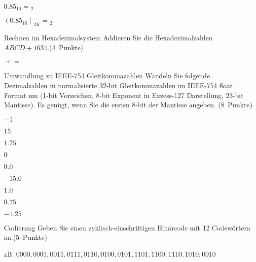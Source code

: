 \documentclass{exercisesheet}
\begin{document}
\begin{solutions}
  \item $0.85_{10} = {}_2$
  \item $ (0.85_{10})_{2K} = {}_2$
  \item
\end{solutions}

\begin{exercise}{Rechnen im Hexadezimalsystem}
  Addieren Sie die Hexadezimalzahlen $ABCD + 1634$.\hfill(4~Punkte)
\end{exercise}

\begin{solution}
  $\mathrm{} + \mathrm{} = \mathrm{}$
\end{solution}

\begin{eexercises}{Umwandlung zu IEEE-754 Gleitkommazahlen}{
    Wandeln Sie folgende Dezimalzahlen in normalisierte 32-bit Gleitkommazahlen im IEEE-754 float Format um (1-bit Vorzeichen, 8-bit Exponent in Exzess-127 Darstellung, 23-bit Mantisse). Es genügt, wenn Sie die ersten 8-bit der Mantisse angeben. (8~Punkte)
  }
  \item $-1$
  \item $15$
  \item $1.25$
  \item $0$
\end{eexercises}

\begin{solutions}
  \item $0.0$
  \item $-15.0$
  \item $1.0$
  \item $0.75$
  \item $-1.25$
\end{solutions}

\begin{exercise}{Codierung}
  Geben Sie einen zyklisch-einschrittigen Binärcode mit 12 Codewörtern an.\hfill(5~Punkte)

  \begin{solution}
    zB. $0000, 0001, 0011, 0111, 0110, 0100, 0101, 1101, 1100, 1110, 1010, 0010$
  \end{solution}
\end{exercise}
\end{document}
